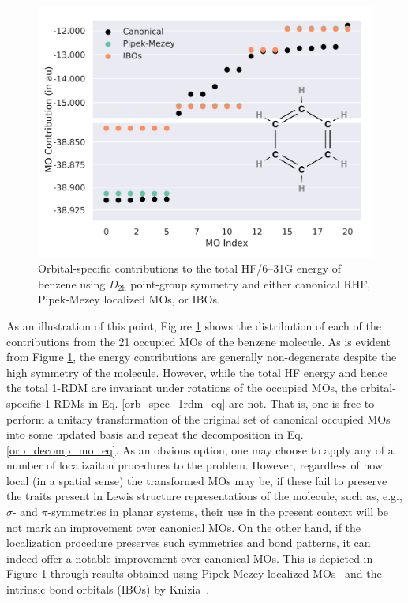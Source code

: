 \documentclass[journal=jctc,manuscript=article]{achemso}
\begin{document}
%
\begin{figure}[ht]
\begin{center}
\includegraphics[width=\textwidth]{figures/c6h6_hf_2.pdf}
\caption{Orbital-specific contributions to the total HF/6--31G energy of benzene using $D_{2\text{h}}$ point-group symmetry and either canonical RHF, Pipek-Mezey localized MOs, or IBOs.}
\label{c6h6_hf_fig}
\end{center}
\end{figure}
%
As an illustration of this point, Figure \ref{c6h6_hf_fig} shows the distribution of each of the contributions from the 21 occupied MOs of the benzene molecule. As is evident from Figure \ref{c6h6_hf_fig}, the energy contributions are generally non-degenerate despite the high symmetry of the molecule. However, while the total HF energy and hence the total 1-RDM are invariant under rotations of the occupied MOs, the orbital-specific 1-RDMs in Eq. \ref{orb_spec_1rdm_eq} are not. That is, one is free to perform a unitary transformation of the original set of canonical occupied MOs into some updated basis and repeat the decomposition in Eq. \ref{orb_decomp_mo_eq}. As an obvious option, one may choose to apply any of a number of localizaiton procedures to the problem. However, regardless of how local (in a spatial sense) the transformed MOs may be, if these fail to preserve the traits present in Lewis structure representations of the molecule, such as, e.g., $\sigma$- and $\pi$-symmetries in planar systems, their use in the present context will be not mark an improvement over canonical MOs. On the other hand, if the localization procedure preserves such symmetries and bond patterns, it can indeed offer a notable improvement over canonical MOs. This is depicted in Figure \ref{c6h6_hf_fig} through results obtained using Pipek-Mezey localized MOs~\cite{pipek_mezey_jcp_1989} and the intrinsic bond orbitals (IBOs) by Knizia~\cite{knizia_iao_ibo_jctc_2013}.\\
\end{document}

